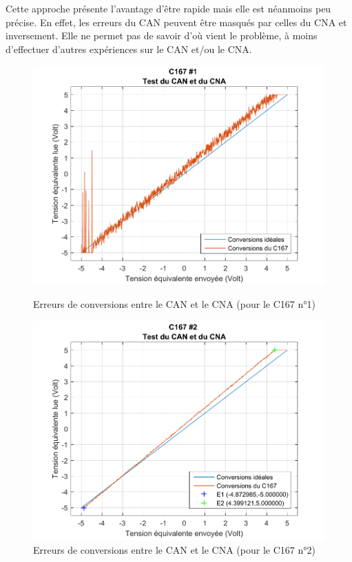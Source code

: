 Cette approche présente l'avantage d'être rapide mais elle est néanmoins peu précise. En effet, les erreurs du CAN peuvent être masqués par celles du CNA et inversement. Elle ne permet pas de savoir d'où vient le problème, à moins d'effectuer d'autres expériences sur le CAN et/ou le CNA.
\begin{figure}[!ht]
\begin{minipage}[t]{.48\textwidth}

\centering 		
\includegraphics[width=.9\textwidth]{./V/images/CAN_CNA_mesures_1.pdf}
\caption{\label{fig:errCAN_1}Erreurs de conversions entre le CAN et le CNA (pour le C167 n°1)}
\end{minipage}\hfill%
\begin{minipage}[t]{.48\textwidth}
\centering 		
\includegraphics[width=.9\textwidth]{./V/images/CAN_CNA_mesures.pdf}
\caption{\label{fig:errCAN}Erreurs de conversions entre le CAN et le CNA (pour le C167 n°2)}
\end{minipage}
\end{figure}

